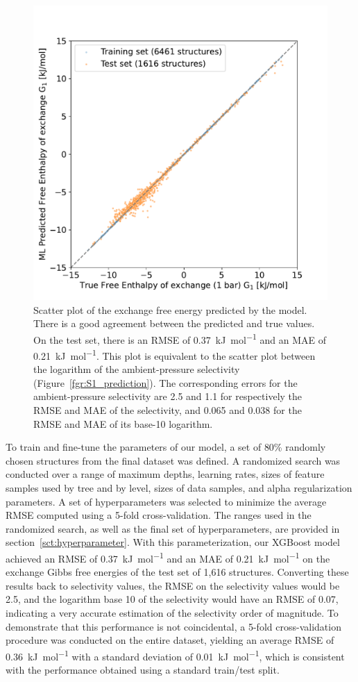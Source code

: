 \documentclass[main]{subfiles}
\begin{document}
\begin{figure}[ht]
\centering
  \includegraphics[width=0.5\linewidth]{figures/4-ml/main/Scatterplot_G1_prediction.pdf}
  \caption{Scatter plot of the exchange free energy predicted by the model. There is a good agreement between the predicted and true values. On the test set, there is an RMSE of \SI{0.37}{\kilo\joule\per\mole} and an MAE of \SI{0.21}{\kilo\joule\per\mole}. This plot is equivalent to the scatter plot between the logarithm of the ambient-pressure selectivity (Figure~\ref{fgr:S1_prediction}). The corresponding errors for the ambient-pressure selectivity are 2.5 and 1.1 for respectively the RMSE and MAE of the selectivity, and 0.065 and 0.038 for the RMSE and MAE of its base-10 logarithm. }\label{fgr:G1_prediction}
\end{figure}

To train and fine-tune the parameters of our model, a set of {80\%} randomly chosen structures from the final dataset was defined. A randomized search was conducted over a range of maximum depths, learning rates, sizes of feature samples used by tree and by level, sizes of data samples, and alpha regularization parameters. A set of hyperparameters was selected to minimize the average RMSE computed using a 5-fold cross-validation. The ranges used in the randomized search, as well as the final set of hyperparameters, are provided in section~\ref{sct:hyperparameter}. With this parameterization, our XGBoost model achieved an RMSE of \SI{0.37}{\kilo\joule\per\mole} and an MAE of \SI{0.21}{\kilo\joule\per\mole} on the exchange Gibbs free energies of the test set of 1,616 structures. Converting these results back to selectivity values, the RMSE on the selectivity values would be 2.5, and the logarithm base 10 of the selectivity would have an RMSE of 0.07, indicating a very accurate estimation of the selectivity order of magnitude. To demonstrate that this performance is not coincidental, a 5-fold cross-validation procedure was conducted on the entire dataset, yielding an average RMSE of \SI{0.36}{\kilo\joule\per\mole} with a standard deviation of \SI{0.01}{\kilo\joule\per\mole}, which is consistent with the performance obtained using a standard train/test split.
\end{document}
